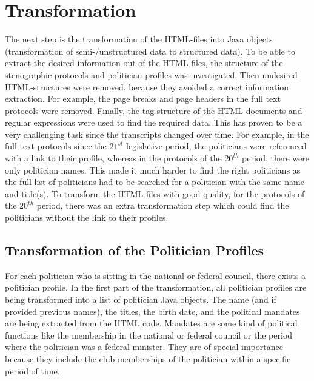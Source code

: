 \section{Transformation}
\label{sec:transformation}
The next step is the transformation of the HTML-files into Java objects (transformation of semi-/unstructured data to structured data). To be able to extract the desired information out of the HTML-files, the structure of the stenographic protocols and politician profiles was investigated. Then undesired HTML-structures were removed, because they avoided a correct information extraction. For example, the page breaks and page headers in the full text protocols were removed. Finally, the tag structure of the HTML documents and regular expressions were used to find the required data. 
This has proven to be a very challenging task since the transcripts changed over time. For example, in the full text protocols since the $21^{st}$ legislative period, the politicians were referenced with a link to their profile, whereas in the protocols of the $20^{th}$ period, there were only politician names. This made it much harder to find the right politicians as the full list of politicians had to be searched for a politician with the same name and title(s). To transform the HTML-files with good quality, for the protocols of the $20^{th}$ period, there was an extra transformation step which could find the politicians without the link to their profiles.

\subsection{Transformation of the Politician Profiles}
For each politician who is sitting in the national or federal council, there exists a politician profile. In the first part of the transformation, all politician profiles are being transformed into a list of politician Java objects. The name (and if provided previous names), the titles, the birth date, and the political mandates are being extracted from the HTML code. Mandates are some kind of political functions like the membership in the national or federal council or the period where the politician was a federal minister. They are of special importance because they include the club memberships of the politician within a specific period of time. 

